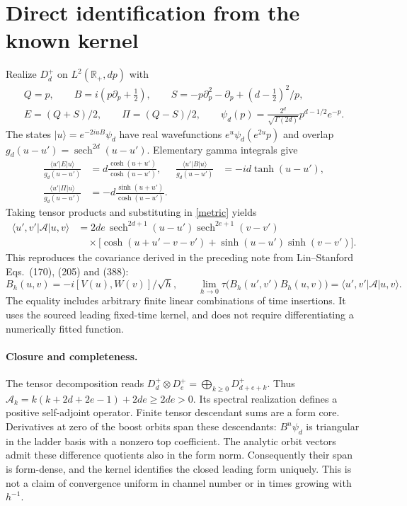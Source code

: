 \documentclass[11pt,a4paper]{article}
\newcommand{\Aop}{\mathcal A}
\DeclareMathOperator{\sech}{sech}
\begin{document}
\newpage
\section{Direct identification from the known kernel}
Realize $D_d^+$ on $L^2(\mathbb R_+,dp)$ with
\begin{gather}
 Q=p,\qquad B=i(p\partial_p+\tfrac12),\qquad
 S=-p\partial_p^2-\partial_p+(d-\tfrac12)^2/p,\nonumber\\
 E=(Q+S)/2,\qquad \Pi=(Q-S)/2,\qquad
 \psi_d(p)=\frac{2^d}{\sqrt{\Gamma(2d)}}p^{d-1/2}e^{-p}.
\end{gather}
The states $|u\rangle=e^{-2iuB}\psi_d$ have real wavefunctions
$e^u\psi_d(e^{2u}p)$ and overlap
$g_d(u-u')=\sech^{2d}(u-u')$.
Elementary gamma integrals give
\begin{align}
 \frac{\langle u'|E|u\rangle}{g_d(u-u')}
 &=d\frac{\cosh(u+u')}{\cosh(u-u')},&
 \frac{\langle u'|B|u\rangle}{g_d(u-u')}
 &=-id\tanh(u-u'),\nonumber\\
 \frac{\langle u'|\Pi|u\rangle}{g_d(u-u')}
 &=-d\frac{\sinh(u+u')}{\cosh(u-u')}.
\end{align}
Taking tensor products and substituting in \eqref{metric} yields
\begin{align}
 \langle u',v'|\Aop|u,v\rangle
 &=2de\,\sech^{2d+1}(u-u')\sech^{2e+1}(v-v')\nonumber\\
 &\quad\times\bigl[\cosh(u+u'-v-v')
             +\sinh(u-u')\sinh(v-v')\bigr].\label{kernel}
\end{align}
This reproduces the covariance derived in the preceding note from
Lin--Stanford Eqs.~(170), (205) and (388):
\[
 B_h(u,v)=-i[V(u),W(v)]/\sqrt h,\qquad
 \lim_{h\to0}\tau\bigl(B_h(u',v')B_h(u,v)\bigr)
 =\langle u',v'|\Aop|u,v\rangle.
\]
The equality includes arbitrary finite linear combinations of time
insertions. It uses the sourced leading fixed-time kernel, and does
not require differentiating a numerically fitted function.

\paragraph{Closure and completeness.}
The tensor decomposition \cite{KV} reads
$D_d^+\otimes D_e^+=\bigoplus_{k\ge0}D_{d+e+k}^+$.
Thus $\Aop_k=k(k+2d+2e-1)+2de\ge2de>0$.
Its spectral realization defines a positive self-adjoint operator.
Finite tensor descendant sums are a form core. Derivatives at zero of
the boost orbits span these descendants: $B^n\psi_d$ is triangular in
the ladder basis with a nonzero top coefficient. The analytic orbit
vectors admit these difference quotients also in the form norm.
Consequently their span is form-dense, and the kernel identifies the
closed leading form uniquely. This is not a claim of convergence
uniform in channel number or in times growing with $h^{-1}$.
\end{document}
